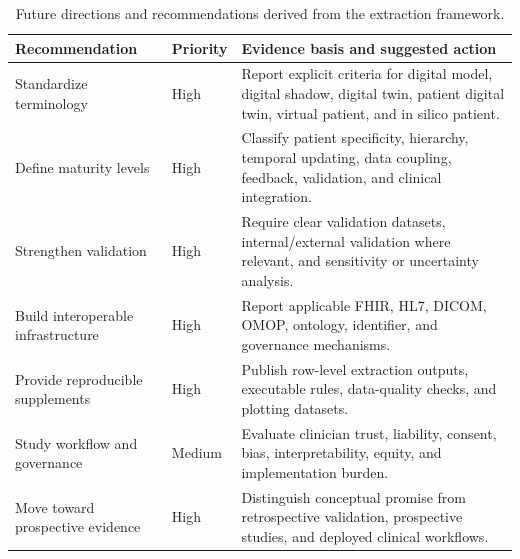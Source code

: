 \begin{table}[htbp]
\centering
\small
\caption{Future directions and recommendations derived from the extraction framework.}
\label{tab:recommendations}
\begin{tabularx}{\textwidth}{@{}>{\raggedright\arraybackslash}p{}YY@{}}
\toprule
\textbf{Recommendation} & \textbf{Priority} & \textbf{Evidence basis and suggested action} \\
\midrule
Standardize terminology & High & Report explicit criteria for digital model, digital shadow, digital twin, patient digital twin, virtual patient, and in silico patient. \\
Define maturity levels & High & Classify patient specificity, hierarchy, temporal updating, data coupling, feedback, validation, and clinical integration. \\
Strengthen validation & High & Require clear validation datasets, internal/external validation where relevant, and sensitivity or uncertainty analysis. \\
Build interoperable infrastructure & High & Report applicable FHIR, HL7, DICOM, OMOP, ontology, identifier, and governance mechanisms. \\
Provide reproducible supplements & High & Publish row-level extraction outputs, executable rules, data-quality checks, and plotting datasets. \\
Study workflow and governance & Medium & Evaluate clinician trust, liability, consent, bias, interpretability, equity, and implementation burden. \\
Move toward prospective evidence & High & Distinguish conceptual promise from retrospective validation, prospective studies, and deployed clinical workflows. \\
\bottomrule
\end{tabularx}
\end{table}
